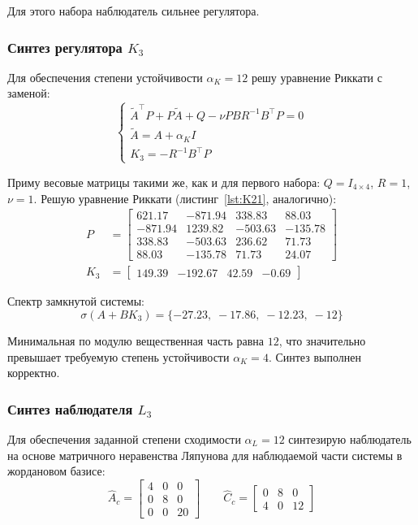 \documentclass[a4paper,12pt]{article}
\begin{document}
	Для этого набора наблюдатель сильнее регулятора.
	
	\subsubsection{Синтез регулятора \(K_3\)}
	
	Для обеспечения степени устойчивости $\alpha_K = 12$ решу уравнение Риккати с заменой:
	\[
	\begin{cases}
		\tilde{A}^\top P + P\tilde{A} + Q - \nu P B R^{-1} B^\top P = 0 \\
		\tilde{A} = A + \alpha_K I \\
		K_3 = -R^{-1}B^\top P
	\end{cases}
	\]
	
	Приму весовые матрицы такими же, как и для первого набора: $Q = I_{4\times4}$, $R = 1$, $\nu = 1$. Решую уравнение Риккати (листинг~\ref{lst:K21}, аналогично):
	\[\begin{aligned}
		P &= \begin{bmatrix}
			621.17 & -871.94 & 338.83 & 88.03 \\
			-871.94 & 1239.82 & -503.63 & -135.78 \\
			338.83 & -503.63 & 236.62 & 71.73 \\
			88.03 & -135.78 & 71.73 & 24.07
		\end{bmatrix} \\[5pt]
		K_3 &= \begin{bmatrix} 149.39 & -192.67 & 42.59 & -0.69 \end{bmatrix}
	\end{aligned}
	\]
	
	Спектр замкнутой системы:
	\[
	\sigma(A + BK_3) = \{-27.23,\; -17.86,\; -12.23,\; -12\}
	\]
	
	Минимальная по модулю вещественная часть равна $12$, что значительно превышает требуемую степень устойчивости $\alpha_K = 4$. Синтез выполнен корректно.
	
	\subsubsection{Синтез наблюдателя $L_3$}
	
	Для обеспечения заданной степени сходимости $\alpha_L = 12$ синтезирую наблюдатель на основе матричного неравенства Ляпунова для наблюдаемой части системы в жордановом базисе:
	\[
	\hat A_c =
	\begin{bmatrix}
		4 & 0 & 0 \\
		0 & 8 & 0 \\
		0 & 0 & 20
	\end{bmatrix} \qquad
	\hat C_c =
	\begin{bmatrix}
		0 & 8 & 0 \\
		4 & 0 & 12
	\end{bmatrix}
	\]
	
\end{document}
